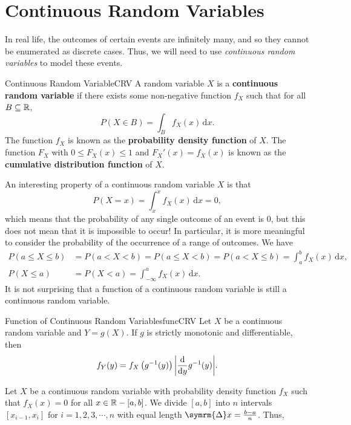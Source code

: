 \documentclass[math]{amznotes}
\theoremstyle{remark}
\newcommand{\dif}{\mathrm{d}}
\begin{document}
\section{Continuous Random Variables}
In real life, the outcomes of certain events are infinitely many, and so they cannot be enumerated as discrete cases. Thus, we will need to use \textit{continuous random variables} to model these events.
\begin{dfnbox}{Continuous Random Variable}{CRV}
    A random variable $X$ is a {\color{red} \textbf{continuous random variable}} if there exists some non-negative function $f_X$ such that for all $B \subseteq \mathbb{R}$,
    \begin{equation*}
        P(X \in B) = \int_B\!f_X(x)\,\mathrm{d}x.
    \end{equation*}
    The function $f_X$ is known as the {\color{red} \textbf{probability density function}} of $X$. The function $F_X$ with $0 \leq F_X(x) \leq 1$ and $F_X'(x) = f_X(x)$ is known as the {\color{red} \textbf{cumulative distribution function}} of $X$.
\end{dfnbox}
An interesting property of a continuous random variable $X$ is that
\begin{equation*}
    P(X = x) = \int_{x}^{x}\!f_X(x) \,\mathrm{d}x = 0,
\end{equation*}
which means that the probability of any single outcome of an event is $0$, but this does not mean that it is impossible to occur! In particular, it is more meaningful to consider the probability of the occurrence of a range of outcomes. We have
\begin{align*}
    P(a \leq X \leq b) & = P(a < X < b) = P(a \leq X < b) = P(a < X \leq b) = \int_{a}^{b}\!f_X(x) \,\mathrm{d}x, \\
    P(X \leq a) & = P(X < a) = \int_{-\infty}^{a}\!f_X(x) \,\mathrm{d}x.
\end{align*}
It is not surprising that a function of a continuous random variable is still a continuous random variable.
\begin{thmbox}{Function of Continuous Random Variables}{funcCRV}
    Let $X$ be a continuous random variable and $Y = g(X)$. If $g$ is strictly monotonic and differentiable, then 
    \begin{equation*}
        f_Y(y) = f_X\left(g^{-1}(y)\right)\abs{\frac{\dif}{\dif y}g^{-1}(y)}.
    \end{equation*}
\end{thmbox}
Let $X$ be a continuous random variable with probability density function $f_X$ such that $f_X(x) = 0$ for all $x \in \mathbb{R} - [a, b]$. We divide $[a, b]$ into $n$ intervals $[x_{i - 1}, x_i]$ for $i = 1, 2, 3, \cdots, n$ with equal length $\symrm{\Delta} x = \frac{b - a}{n}$. Thus,
\end{document}
